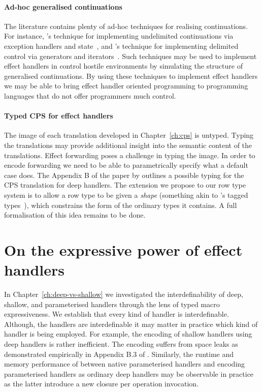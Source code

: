 \documentclass[12pt,phd,lfcs,twoside,openright,logo,leftchapter,normalheadings]{infthesis}
\theoremstyle{plain}
\theoremstyle{definition}
\begin{document}
\paragraph{Ad-hoc generalised continuations}
The literature contains plenty of ad-hoc techniques for realising
continuations. For instance, \citeauthor{PettyjohnCMKF05}'s technique
for implementing undelimited continuations via exception handlers and
state~\cite{PettyjohnCMKF05}, and \citeauthor{JamesS11}'s technique
for implementing delimited control via generators and
iterators~\cite{JamesS11}. Such techniques may be used to implement
effect handlers in control hostile environments by simulating the
structure of generalised continuations. By using these techniques to
implement effect handlers we may be able to bring effect handler
oriented programming to programming languages that do not offer
programmers much control.

\paragraph{Typed CPS for effect handlers} The image of each
translation developed in Chapter~\ref{ch:cps} is untyped. Typing the
translations may provide additional insight into the semantic content
of the translations. Effect forwarding poses a challenge in typing the
image.  In order to encode forwarding we need to be able to
parametrically specify what a default case does.
%
The Appendix B of the paper by \citet{HillerstromLAS17} outlines a
possible typing for the CPS translation for deep handlers.  The
extension we propose to our row type system is to allow a row type to
be given a \emph{shape} (something akin to
\citeauthor{BerthomieuS95}'s tagged types~\cite{BerthomieuS95}), which
constrains the form of the ordinary types it contains. A full
formalisation of this idea remains to be done.


\section{On the expressive power of effect handlers}

In Chapter~\ref{ch:deep-vs-shallow} we investigated the
interdefinability of deep, shallow, and parameterised handlers through
the lens of typed macro expressiveness. We establish that every kind
of handler is interdefinable. Although, the handlers are
interdefinable it may matter in practice which kind of handler is
being employed. For example, the encoding of shallow handlers using
deep handlers is rather inefficient. The encoding suffers from space
leaks as demonstrated empirically in Appendix B.3 of
\citet{HillerstromL18}. Similarly, the runtime and memory performance
of between native parameterised handlers and encoding parameterised
handlers as ordinary deep handlers may be observable in practice as
the latter introduce a new closure per operation invocation.
\end{document}
